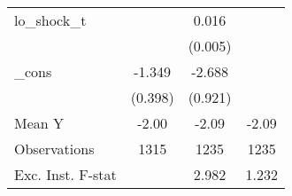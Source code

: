 {\begin{tabular}{l*{3}{c}}
\addlinespace
lo\_shock\_t  &                     &       0.016\sym{***}&                     \\
            &                     &     (0.005)         &                     \\
\addlinespace
\_cons      &      -1.349\sym{***}&      -2.688\sym{***}&                     \\
            &     (0.398)         &     (0.921)         &                     \\
\midrule
Mean Y      &       -2.00         &       -2.09         &       -2.09         \\
Observations&        1315         &        1235         &        1235         \\
Exc. Inst. F-stat&                     &       2.982         &       1.232         \\
\bottomrule
\end{tabular}
}
